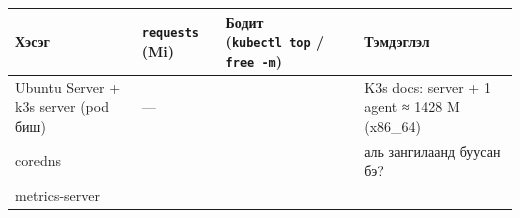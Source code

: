 \begingroup\scriptsize\begin{longtable}[]{@{}llll@{}}
\toprule
\begin{minipage}[b]{0.22\columnwidth}\raggedright
Хэсэг\strut
\end{minipage} & \begin{minipage}[b]{0.22\columnwidth}\raggedright
\texttt{requests} (Mi)\strut
\end{minipage} & \begin{minipage}[b]{0.22\columnwidth}\raggedright
Бодит (\texttt{kubectl\ top} / \texttt{free\ -m})\strut
\end{minipage} & \begin{minipage}[b]{0.22\columnwidth}\raggedright
Тэмдэглэл\strut
\end{minipage}\tabularnewline
\midrule
\endhead
\begin{minipage}[t]{0.22\columnwidth}\raggedright
Ubuntu Server + k3s server (pod биш)\strut
\end{minipage} & \begin{minipage}[t]{0.22\columnwidth}\raggedright
---\strut
\end{minipage} & \begin{minipage}[t]{0.22\columnwidth}\raggedright
\strut
\end{minipage} & \begin{minipage}[t]{0.22\columnwidth}\raggedright
K3s docs: server + 1 agent ≈ 1428 M (x86\_64)\strut
\end{minipage}\tabularnewline
\begin{minipage}[t]{0.22\columnwidth}\raggedright
coredns\strut
\end{minipage} & \begin{minipage}[t]{0.22\columnwidth}\raggedright
\strut
\end{minipage} & \begin{minipage}[t]{0.22\columnwidth}\raggedright
\strut
\end{minipage} & \begin{minipage}[t]{0.22\columnwidth}\raggedright
аль зангилаанд буусан бэ?\strut
\end{minipage}\tabularnewline
\begin{minipage}[t]{0.22\columnwidth}\raggedright
metrics-server\strut
\end{minipage} & \begin{minipage}[t]{0.22\columnwidth}\raggedright
\strut
\end{minipage} & \begin{minipage}[t]{0.22\columnwidth}\raggedright

\end{minipage}
\end{longtable}

